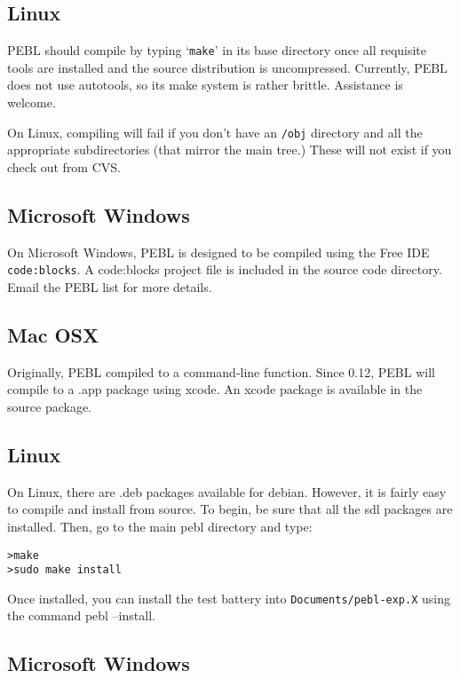 \subsection{Linux}

PEBL should compile by typing `\texttt{make}' in its base directory
once all requisite tools are installed and the source distribution is
uncompressed. Currently, PEBL does not use autotools, so its make
system is rather brittle. Assistance is welcome.

On Linux, compiling will fail if you don't have an \texttt{/obj}
directory and all the appropriate subdirectories (that mirror the main
tree.)  These will not exist if you check out from CVS.

\subsection{Microsoft Windows}

On Microsoft Windows, PEBL is designed to be compiled using the Free
IDE \texttt{code:blocks}.  A code:blocks project file is included in the source code directory. Email the PEBL list for more details.

\subsection{Mac OSX}

Originally, PEBL compiled to a command-line function.  Since 0.12, PEBL will compile to a .app package using xcode.  An xcode package is available in the source package.


\subsection{Linux}

On Linux, there are .deb packages available for debian.  However, it is fairly easy to 
compile and install from source. To begin, be sure that all the sdl packages are installed.  Then, go to the main pebl directory and type:
\begin{verbatim}
>make
>sudo make install
\end{verbatim}
Once installed, you can install the test battery into \texttt{Documents/pebl-exp.X} using the command pebl --install.

\subsection{Microsoft Windows}

